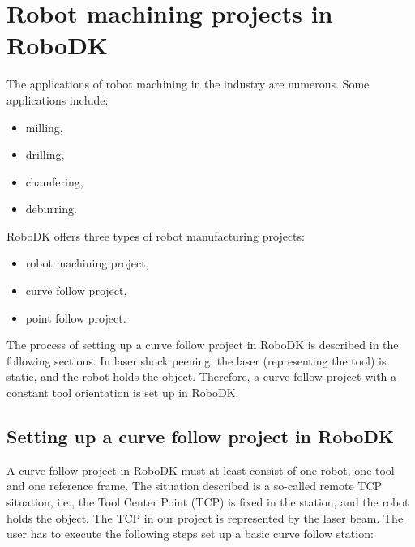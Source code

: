 \section{Robot machining projects in RoboDK}

The applications of robot machining in the industry are numerous. Some applications include:

\begin{itemize}

    \item milling,
    \item drilling,
    \item chamfering,
    \item deburring.

\end{itemize}

RoboDK offers three types of robot manufacturing projects:

\begin{itemize}

    \item robot machining project,
    \item curve follow project, 
    \item point follow project. 

\end{itemize}

The process of setting up a curve follow project in RoboDK is described in the following sections. In laser shock peening, the laser (representing the tool) is static, and the robot holds the object. Therefore, a curve follow project with a constant tool orientation is set up in RoboDK.

\subsection{Setting up a curve follow project in RoboDK}

A curve follow project in RoboDK must at least consist of one robot, one tool and one reference frame. The situation described is a so-called remote TCP situation, i.e., the Tool Center Point (TCP) is fixed in the station, and the robot holds the object. The TCP in our project is represented by the laser beam. 
The user has to execute the following steps set up a basic curve follow station: 

